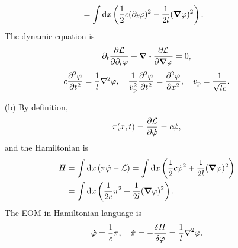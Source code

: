 \documentclass[hyperref, a4paper]{article}
\begin{document}
\begin{itemize}
\begin{equation}
\begin{aligned}
        &= \int \dd{x} \left(
            \frac{1}{2} c (\partial_t \varphi)^2 - \frac{1}{2 l} (\grad{\varphi})^2
        \right).
    \end{aligned}
\end{equation}
The dynamic equation is 
\[
    \partial_t \pdv{\mathcal{L}}{\partial_t \varphi} + \div \pdv{\mathcal{L}}{\grad{\varphi}} = 0,
\]
\begin{equation}
    c \pdv[2]{\varphi}{t} = \frac{1}{l} \laplacian \varphi, \quad 
    \frac{1}{v_{\text{p}}^2} \pdv[2]{\varphi}{t} = \pdv[2]{\varphi}{x}, \quad 
    v_{\text{p}} = \frac{1}{\sqrt{lc}}.
    \label{eq:telegraph-eq}
\end{equation}

\item[(b)] By definition, 
\begin{equation}
    \pi(x, t) = \pdv{\mathcal{L}}{\dot{\varphi}} = c \dot{\varphi},
\end{equation}
and the Hamiltonian is 
\begin{equation}
    \begin{aligned}
        H &= \int \dd{x} (\pi \dot{\varphi} - \mathcal{L}) 
        = \int \dd{x} \left( \frac{1}{2} c \dot{\varphi}^2 + \frac{1}{2l} (\grad{\varphi})^2 \right) \\
        &= \int \dd{x} \left( \frac{1}{2c} \pi^2 + \frac{1}{2l} (\grad{\varphi})^2 \right) .
    \end{aligned}
\end{equation}
The EOM in Hamiltonian language is 
\begin{equation}
    \dot{\varphi} = \frac{1}{c} \pi, \quad 
    \dot{\pi} = - \fdv{H}{\varphi} = \frac{1}{l} \laplacian \varphi.
\end{equation}


\end{itemize}
\end{document}
